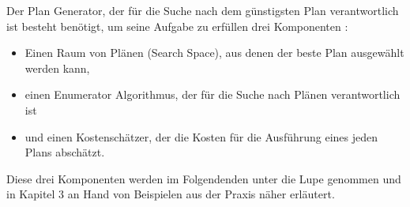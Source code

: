 Der Plan Generator, der für die Suche nach dem günstigsten Plan verantwortlich ist besteht benötigt, um seine Aufgabe zu erfüllen drei Komponenten \cite{chaudhuri1998overview}: 

\begin{itemize}
\item Einen Raum von Plänen (Search Space), aus denen der beste Plan ausgewählt werden kann,
\item einen Enumerator Algorithmus, der für die Suche nach Plänen verantwortlich ist
\item und einen Kostenschätzer, der die Kosten für die Ausführung eines jeden Plans abschätzt.
\end{itemize}

Diese drei Komponenten werden im Folgendenden unter die Lupe genommen und in Kapitel 3 an Hand von Beispielen aus der Praxis näher erläutert.

